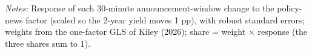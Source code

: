 \begin{table}[tp]\centering\small
\caption{Market-Index Weights from Policy News}\label{tab:weights}
\begin{flushleft}\footnotesize\textit{Notes:} Response of each 30-minute announcement-window change to the policy-news factor (scaled so the 2-year yield moves 1 pp), with robust standard errors; weights from the one-factor GLS of Kiley (2026); share = weight $\times$ response (the three shares sum to 1).\end{flushleft}
\end{table}
